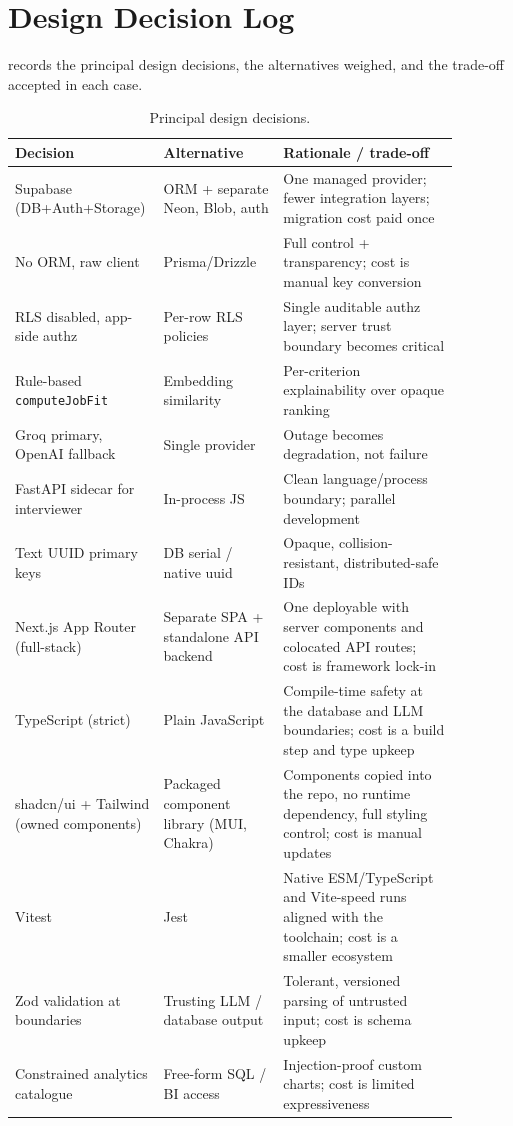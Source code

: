 
\section{Design Decision Log}
\label{sec:design-decisions}

 records the principal design decisions, the
alternatives weighed, and the trade-off accepted in each case.

\begin{table}[H]
\centering
\caption[Design decision log]{Principal design decisions.}
\label{tab:design-decisions}
\footnotesize
\begin{tabular}{p{0.24\linewidth}p{0.26\linewidth}p{0.38\linewidth}}
\toprule
\textbf{Decision} & \textbf{Alternative} & \textbf{Rationale / trade-off} \\
\midrule
Supabase (DB+Auth+Storage) & ORM + separate Neon, Blob, auth & One managed provider; fewer integration layers; migration cost paid once \\
No ORM, raw client & Prisma/Drizzle & Full control + transparency; cost is manual key conversion \\
RLS disabled, app-side authz & Per-row RLS policies & Single auditable authz layer; server trust boundary becomes critical \\
Rule-based \texttt{computeJobFit} & Embedding similarity & Per-criterion explainability over opaque ranking \\
Groq primary, OpenAI fallback & Single provider & Outage becomes degradation, not failure \\
FastAPI sidecar for interviewer & In-process JS & Clean language/process boundary; parallel development \\
Text UUID primary keys & DB serial / native uuid & Opaque, collision-resistant, distributed-safe IDs \\
Next.js App Router (full-stack) & Separate SPA + standalone API backend & One deployable with server components and colocated API routes; cost is framework lock-in \\
TypeScript (strict) & Plain JavaScript & Compile-time safety at the database and LLM boundaries; cost is a build step and type upkeep \\
shadcn/ui + Tailwind (owned components) & Packaged component library (MUI, Chakra) & Components copied into the repo, no runtime dependency, full styling control; cost is manual updates \\
Vitest & Jest & Native ESM/TypeScript and Vite-speed runs aligned with the toolchain; cost is a smaller ecosystem \\
Zod validation at boundaries & Trusting LLM / database output & Tolerant, versioned parsing of untrusted input; cost is schema upkeep \\
Constrained analytics catalogue & Free-form SQL / BI access & Injection-proof custom charts; cost is limited expressiveness \\
\bottomrule
\end{tabular}
\end{table}
